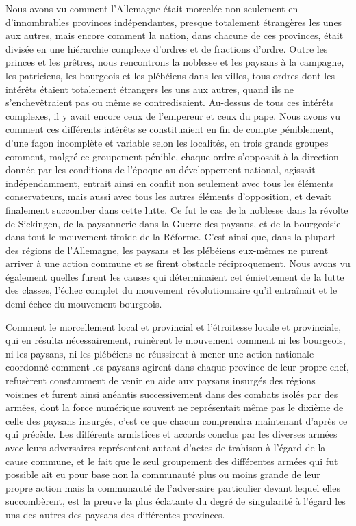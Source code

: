 \documentclass[french,twoside]{book} %
\begin{document}
Nous avons vu comment l’Allemagne était morcelée non seulement en d’innombrables provinces indépendantes, presque totalement étrangères les unes aux autres, mais encore comment la nation, dans chacune de ces provinces, était divisée en une hiérarchie complexe d’ordres et de fractions d’ordre. Outre les princes et les prêtres, nous rencontrons la noblesse et les paysans à la campagne, les patriciens, les bourgeois et les plébéiens dans les villes, tous ordres dont les intérêts étaient totalement étrangers les uns aux autres, quand ils ne s’enchevêtraient pas ou même se contredisaient. Au-dessus de tous ces intérêts complexes, il y avait encore ceux de l’empereur et ceux du pape. Nous avons vu comment ces différents intérêts se constituaient en fin de compte péniblement, d’une façon incomplète et variable selon les localités, en trois grands groupes comment, malgré ce groupement pénible, chaque ordre s’opposait à la direction donnée par les conditions de l’époque au développement national, agissait indépendamment, entrait ainsi en conflit non seulement avec tous les éléments conservateurs, mais aussi avec tous les autres éléments d’opposition, et devait finalement succomber dans cette lutte. Ce fut le cas de la noblesse dans la révolte de Sickingen, de la paysannerie dans la Guerre des paysans, et de la bourgeoisie dans tout le mouvement timide de la Réforme. C’est ainsi que, dans la plupart des régions de l’Allemagne, les paysans et les plébéiens eux-mêmes ne purent arriver à une action commune et se firent obstacle réciproquement. Nous avons vu également quelles furent les causes qui déterminaient cet émiettement de la lutte des classes, l’échec complet du mouvement révolutionnaire qu’il entraînait et le demi-échec du mouvement bourgeois.\par
Comment le morcellement local et provincial et l’étroitesse locale et provinciale, qui en résulta nécessairement, ruinèrent le mouvement comment ni les bourgeois, ni les paysans, ni les plébéiens ne réussirent à mener une action nationale coordonné comment les paysans agirent dans chaque province de leur propre chef, refusèrent constamment de venir en aide aux paysans insurgés des régions voisines et furent ainsi anéantis successivement dans des combats isolés par des armées, dont la force numérique souvent ne représentait même pas le dixième de celle des paysans insurgés, c’est ce que chacun comprendra maintenant d’après ce qui précède. Les différents armistices et accords conclus par les diverses armées avec leurs adversaires représentent autant d’actes de trahison à l’égard de la cause commune, et le fait que le seul groupement des différentes armées qui fut possible ait eu pour base non la communauté plus ou moins grande de leur propre action mais la communauté de l’adversaire particulier devant lequel elles succombèrent, est la preuve la plus éclatante du degré de singularité à l’égard les uns des autres des paysans des différentes provinces.\par
\end{document}
